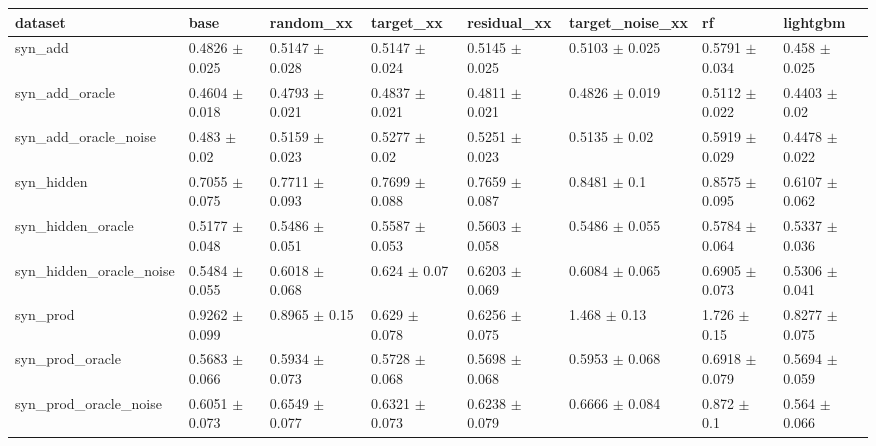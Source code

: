 \begin{tabular}{llllllll}
\toprule
dataset & base & random\_xx & target\_xx & residual\_xx & target\_noise\_xx & rf & lightgbm \\
\midrule
syn\_add & 0.4826 $\pm$ 0.025 & 0.5147 $\pm$ 0.028 & 0.5147 $\pm$ 0.024 & 0.5145 $\pm$ 0.025 & 0.5103 $\pm$ 0.025 & 0.5791 $\pm$ 0.034 & 0.458 $\pm$ 0.025 \\
syn\_add\_oracle & 0.4604 $\pm$ 0.018 & 0.4793 $\pm$ 0.021 & 0.4837 $\pm$ 0.021 & 0.4811 $\pm$ 0.021 & 0.4826 $\pm$ 0.019 & 0.5112 $\pm$ 0.022 & 0.4403 $\pm$ 0.02 \\
syn\_add\_oracle\_noise & 0.483 $\pm$ 0.02 & 0.5159 $\pm$ 0.023 & 0.5277 $\pm$ 0.02 & 0.5251 $\pm$ 0.023 & 0.5135 $\pm$ 0.02 & 0.5919 $\pm$ 0.029 & 0.4478 $\pm$ 0.022 \\
syn\_hidden & 0.7055 $\pm$ 0.075 & 0.7711 $\pm$ 0.093 & 0.7699 $\pm$ 0.088 & 0.7659 $\pm$ 0.087 & 0.8481 $\pm$ 0.1 & 0.8575 $\pm$ 0.095 & 0.6107 $\pm$ 0.062 \\
syn\_hidden\_oracle & 0.5177 $\pm$ 0.048 & 0.5486 $\pm$ 0.051 & 0.5587 $\pm$ 0.053 & 0.5603 $\pm$ 0.058 & 0.5486 $\pm$ 0.055 & 0.5784 $\pm$ 0.064 & 0.5337 $\pm$ 0.036 \\
syn\_hidden\_oracle\_noise & 0.5484 $\pm$ 0.055 & 0.6018 $\pm$ 0.068 & 0.624 $\pm$ 0.07 & 0.6203 $\pm$ 0.069 & 0.6084 $\pm$ 0.065 & 0.6905 $\pm$ 0.073 & 0.5306 $\pm$ 0.041 \\
syn\_prod & 0.9262 $\pm$ 0.099 & 0.8965 $\pm$ 0.15 & 0.629 $\pm$ 0.078 & 0.6256 $\pm$ 0.075 & 1.468 $\pm$ 0.13 & 1.726 $\pm$ 0.15 & 0.8277 $\pm$ 0.075 \\
syn\_prod\_oracle & 0.5683 $\pm$ 0.066 & 0.5934 $\pm$ 0.073 & 0.5728 $\pm$ 0.068 & 0.5698 $\pm$ 0.068 & 0.5953 $\pm$ 0.068 & 0.6918 $\pm$ 0.079 & 0.5694 $\pm$ 0.059 \\
syn\_prod\_oracle\_noise & 0.6051 $\pm$ 0.073 & 0.6549 $\pm$ 0.077 & 0.6321 $\pm$ 0.073 & 0.6238 $\pm$ 0.079 & 0.6666 $\pm$ 0.084 & 0.872 $\pm$ 0.1 & 0.564 $\pm$ 0.066 \\
\bottomrule
\end{tabular}
